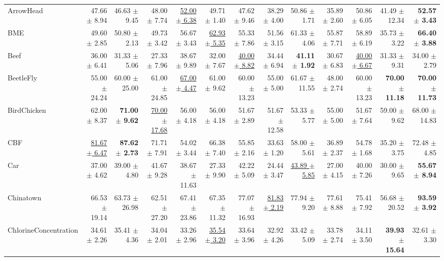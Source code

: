 \begin{landscape}
\begin{longtable}{lrrrrrrrrrrrr}
ArrowHead & 47.66 $\pm$ 8.94 & 46.63 $\pm$ 9.45 & 48.00 $\pm$ 7.74 & \underline{52.00 $\pm$ 6.38} & 49.71 $\pm$ 1.40 & 47.62 $\pm$ 9.46 & 38.29 $\pm$ 4.00 & 50.86 $\pm$ 1.71 & 35.89 $\pm$ 2.60 & 50.86 $\pm$ 6.05 & 41.49 $\pm$ 12.34 & \textbf{52.57 $\pm$ 3.43} \\
BME & 49.60 $\pm$ 2.85 & 50.80 $\pm$ 2.13 & 49.73 $\pm$ 3.42 & 56.67 $\pm$ 3.43 & \underline{62.93 $\pm$ 5.35} & 55.33 $\pm$ 7.86 & 51.56 $\pm$ 3.15 & 61.33 $\pm$ 4.06 & 55.87 $\pm$ 7.71 & 58.89 $\pm$ 6.19 & 35.73 $\pm$ 3.22 & \textbf{66.40 $\pm$ 3.88} \\
Beef & 36.00 $\pm$ 6.41 & 31.33 $\pm$ 5.06 & 27.33 $\pm$ 7.96 & 38.67 $\pm$ 9.89 & 32.00 $\pm$ 7.67 & \underline{40.00 $\pm$ 8.82} & 34.44 $\pm$ 6.94 & \textbf{41.11 $\pm$ 1.92} & 30.67 $\pm$ 6.83 & \underline{40.00 $\pm$ 6.67} & 31.33 $\pm$ 9.31 & 34.00 $\pm$ 2.79 \\
BeetleFly & 55.00 $\pm$ 24.24 & 60.00 $\pm$ 25.00 & 61.00 $\pm$ 24.85 & \underline{67.00 $\pm$ 4.47} & 61.00 $\pm$ 9.62 & 60.00 $\pm$ 13.23 & 55.00 $\pm$ 5.00 & 61.67 $\pm$ 11.55 & 48.00 $\pm$ 2.74 & 60.00 $\pm$ 13.23 & \textbf{70.00 $\pm$ 11.18} & \textbf{70.00 $\pm$ 11.73} \\
BirdChicken & 62.00 $\pm$ 8.37 & \textbf{71.00 $\pm$ 9.62} & \underline{70.00 $\pm$ 17.68} & 56.00 $\pm$ 4.18 & 56.00 $\pm$ 4.18 & 51.67 $\pm$ 2.89 & 51.67 $\pm$ 12.58 & 53.33 $\pm$ 5.77 & 55.00 $\pm$ 5.00 & 51.67 $\pm$ 7.64 & 59.00 $\pm$ 9.62 & 68.00 $\pm$ 14.83 \\
CBF & \underline{81.67 $\pm$ 6.47} & \textbf{87.62 $\pm$ 2.73} & 71.71 $\pm$ 7.91 & 54.02 $\pm$ 3.44 & 66.38 $\pm$ 7.40 & 55.85 $\pm$ 2.16 & 33.63 $\pm$ 1.20 & 58.00 $\pm$ 5.61 & 36.89 $\pm$ 2.37 & 54.78 $\pm$ 1.68 & 35.20 $\pm$ 3.75 & 72.48 $\pm$ 4.85 \\
Car & 37.00 $\pm$ 4.62 & 39.00 $\pm$ 4.80 & 41.67 $\pm$ 9.28 & 38.67 $\pm$ 11.63 & 27.33 $\pm$ 9.90 & 42.22 $\pm$ 5.09 & 24.44 $\pm$ 3.47 & \underline{43.89 $\pm$ 5.85} & 27.00 $\pm$ 4.15 & 40.00 $\pm$ 7.26 & 30.00 $\pm$ 9.65 & \textbf{55.67 $\pm$ 8.94} \\
Chinatown & 66.53 $\pm$ 19.14 & 63.73 $\pm$ 26.98 & 62.51 $\pm$ 27.20 & 67.41 $\pm$ 23.86 & 67.35 $\pm$ 11.32 & 77.07 $\pm$ 16.93 & \underline{81.83 $\pm$ 2.19} & 77.94 $\pm$ 9.20 & 77.61 $\pm$ 8.88 & 75.41 $\pm$ 7.92 & 56.68 $\pm$ 20.52 & \textbf{93.59 $\pm$ 3.92} \\
ChlorineConcentration & 34.61 $\pm$ 2.26 & 35.41 $\pm$ 4.36 & 34.04 $\pm$ 2.01 & 33.26 $\pm$ 2.96 & \underline{35.54 $\pm$ 3.20} & 33.64 $\pm$ 3.96 & 32.92 $\pm$ 4.26 & 33.42 $\pm$ 5.09 & 33.78 $\pm$ 2.74 & 34.11 $\pm$ 3.50 & \textbf{39.93 $\pm$ 15.64} & 32.61 $\pm$ 3.30 \\

\end{longtable}
\end{landscape}
